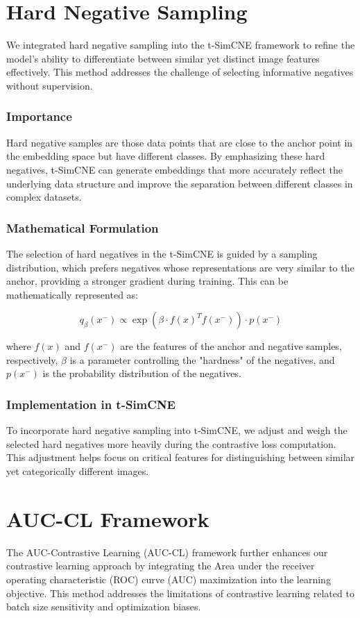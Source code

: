\section{Hard Negative Sampling}
We integrated hard negative sampling into the t-SimCNE framework to refine the model's ability to differentiate between similar yet distinct image features effectively. This method addresses the challenge of selecting informative negatives without supervision.

\subsubsection{Importance}
Hard negative samples are those data points that are close to the anchor point in the embedding space but have different classes. By emphasizing these hard negatives, t-SimCNE can generate embeddings that more accurately reflect the underlying data structure and improve the separation between different classes in complex datasets.

\subsubsection{Mathematical Formulation}
The selection of hard negatives in the t-SimCNE is guided by a sampling distribution, which prefers negatives whose representations are very similar to the anchor, providing a stronger gradient during training. This can be mathematically represented as:

\begin{equation}
q_{\beta}(x^-) \propto \exp(\beta \cdot f(x)^T f(x^-)) \cdot p(x^-)
\end{equation}

where $f(x)$ and $f(x^-)$ are the features of the anchor and negative samples, respectively, $\beta$ is a parameter controlling the "hardness" of the negatives, and $p(x^-)$ is the probability distribution of the negatives.

\subsubsection{Implementation in t-SimCNE}
To incorporate hard negative sampling into t-SimCNE, we adjust and weigh the selected hard negatives more heavily during the contrastive loss computation. This adjustment helps focus on critical features for distinguishing between similar yet categorically different images.

\section{AUC-CL Framework}
The AUC-Contrastive Learning (AUC-CL) framework further enhances our contrastive learning approach by integrating the Area under the receiver operating characteristic (ROC) curve (AUC) maximization into the learning objective. This method addresses the limitations of contrastive learning related to batch size sensitivity and optimization biases.

